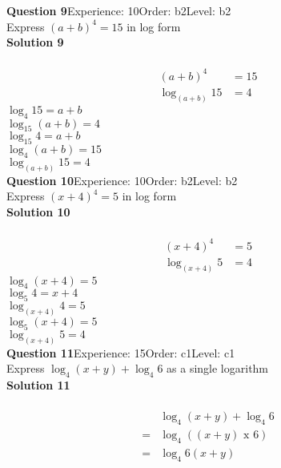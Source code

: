 \documentclass{article}
\begin{document}
\noindent\textbf{Question 9}\hspace{20pt}Experience: 10\hspace{20pt}Order: b2\hspace{20pt}Level: b2\\[2pt]
Express $(a+b)^4=15$ in log form\\[4pt]
\noindent\textbf{Solution 9}\\[2pt]
\\[-10pt]\begin{align*}
(a+b)^4&=15\\[2pt]
\log_{(a+b)}15&=4
\end{align*}
$\log_{4}15=a+b$\\
$\log_{15}(a+b)=4$\\
$\log_{15}4=a+b$\\
$\log_{4}(a+b)=15$\\
$\log_{(a+b)}15=4$\\
\noindent\textbf{Question 10}\hspace{20pt}Experience: 10\hspace{20pt}Order: b2\hspace{20pt}Level: b2\\[2pt]
Express $(x+4)^4=5$ in log form\\[4pt]
\noindent\textbf{Solution 10}\\[2pt]
\\[-10pt]\begin{align*}
(x+4)^4&=5\\[2pt]
\log_{(x+4)}5&=4
\end{align*}
$\log_{4}(x+4)=5$\\
$\log_{5}4=x+4$\\
$\log_{(x+4)}4=5$\\
$\log_{5}(x+4)=5$\\
$\log_{(x+4)}5=4$\\
\noindent\textbf{Question 11}\hspace{20pt}Experience: 15\hspace{20pt}Order: c1\hspace{20pt}Level: c1\\[2pt]
Express $\log_{4}(x+y)+\log_{4}6$ as a single logarithm\\[4pt]
\noindent\textbf{Solution 11}\\[2pt]
\\[-10pt]\begin{align*}
&\log_{4}(x+y)+\log_{4}6\\[2pt]
=&\log_{4}((x+y) \,\, \text{x} \,\, 6)\\[2pt]
=&\log_{4}6(x+y)
\end{align*}
\end{document}
